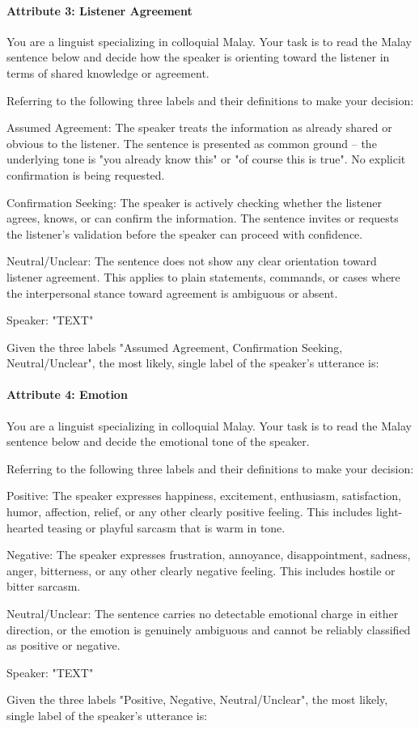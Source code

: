 \documentclass[11pt]{article}
\begin{document}
\paragraph{Attribute 3: Listener Agreement}
\begin{PromptBlock}
You are a linguist specializing in colloquial Malay. Your task is to read the Malay sentence below and decide how the speaker is orienting toward the listener in terms of shared knowledge or agreement.

Referring to the following three labels and their definitions to make your decision:

Assumed Agreement: The speaker treats the information as already shared or obvious to the listener. The sentence is presented as common ground -- the underlying tone is "you already know this" or "of course this is true". No explicit confirmation is being requested.

Confirmation Seeking: The speaker is actively checking whether the listener agrees, knows, or can confirm the information. The sentence invites or requests the listener's validation before the speaker can proceed with confidence.

Neutral/Unclear: The sentence does not show any clear orientation toward listener agreement. This applies to plain statements, commands, or cases where the interpersonal stance toward agreement is ambiguous or absent.

Speaker: "{TEXT}"

Given the three labels "Assumed Agreement, Confirmation Seeking, Neutral/Unclear", the most likely, single label of the speaker's utterance is:
\end{PromptBlock}

\paragraph{Attribute 4: Emotion}
\begin{PromptBlock}
You are a linguist specializing in colloquial Malay. Your task is to read the Malay sentence below and decide the emotional tone of the speaker.

Referring to the following three labels and their definitions to make your decision:

Positive: The speaker expresses happiness, excitement, enthusiasm, satisfaction, humor, affection, relief, or any other clearly positive feeling. This includes light-hearted teasing or playful sarcasm that is warm in tone.

Negative: The speaker expresses frustration, annoyance, disappointment, sadness, anger, bitterness, or any other clearly negative feeling. This includes hostile or bitter sarcasm.

Neutral/Unclear: The sentence carries no detectable emotional charge in either direction, or the emotion is genuinely ambiguous and cannot be reliably classified as positive or negative.

Speaker: "{TEXT}"

Given the three labels "Positive, Negative, Neutral/Unclear", the most likely, single label of the speaker's utterance is:
\end{PromptBlock}
\end{document}
